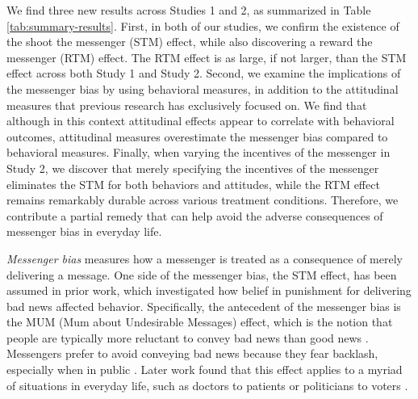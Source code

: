 

We find three new results across Studies 1 and 2, as summarized in 
Table \ref{tab:summary-results}. First, in both of our
studies, we confirm the existence of the shoot the messenger (STM)
effect, while also discovering a reward the messenger (RTM) effect. The
RTM effect is as large, if not larger, than the STM effect across both
Study 1 and Study 2. Second, we examine the implications of the
messenger bias by using behavioral measures, in addition to the
attitudinal measures that previous research has exclusively focused on.
We find that although in this context attitudinal effects appear to
correlate with behavioral outcomes, attitudinal measures overestimate
the messenger bias compared to behavioral measures. Finally, when
varying the incentives of the messenger in Study 2, we discover that
merely specifying the incentives of the messenger eliminates the STM for
both behaviors and attitudes, while the RTM effect remains remarkably
durable across various treatment conditions. Therefore, we contribute a
partial remedy that can help avoid the adverse consequences of messenger
bias in everyday life.


\emph{Messenger bias} measures how a messenger is treated as a
consequence of merely delivering a message. One side of the messenger
bias, the STM effect, has been assumed in prior work, which investigated
how belief in punishment for delivering bad news affected behavior.
Specifically, the antecedent of the messenger bias is the MUM (Mum about
Undesirable Messages) effect, which is the notion that people are
typically more reluctant to convey bad news than good news \citep{rosen1970reluctance,rosen1972fear}. 
Messengers prefer to avoid conveying bad news
because they fear backlash, especially when in public \citep{bond1987reluctance}.
 Later work found that this effect applies to a myriad
of situations in everyday life, such as doctors to patients \citep{clark1982death, sheldon1982truth, taylor1988telling}
 or politicians to voters \citep{dorling2002good,levy2014soothing}.

